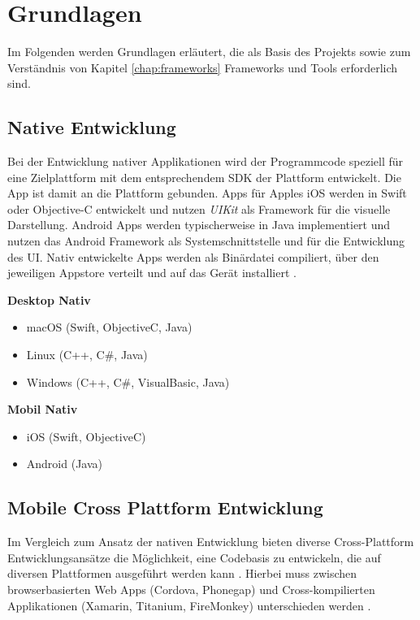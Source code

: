 
\chapter{Grundlagen}

Im Folgenden werden Grundlagen erläutert, die als Basis des Projekts sowie zum Verständnis von Kapitel \ref{chap:frameworks} Frameworks und Tools erforderlich sind.


\section{Native Entwicklung}

Bei der Entwicklung nativer Applikationen wird der Programmcode speziell für eine Zielplattform mit dem entsprechendem \ac{SDK} der Plattform entwickelt.
Die App ist damit an die Plattform gebunden. Apps für Apples iOS werden in Swift oder Objective-C entwickelt und nutzen \emph{UIKit} als Framework für die visuelle Darstellung.
Android Apps werden typischerweise in Java implementiert und nutzen das Android Framework als Systemschnittstelle und für die Entwicklung des \ac{UI}.
Nativ entwickelte Apps werden als Binärdatei compiliert, über den jeweiligen Appstore verteilt und auf das Gerät installiert \cite{Heitkoetter2013}.

\vspace{0.3cm}
\textbf{Desktop Nativ}
\begin{itemize}
\item macOS (Swift, ObjectiveC, Java)
\item Linux (C++, C\#, Java)
\item Windows (C++, C\#, VisualBasic, Java)
\end{itemize}
\vspace{0.3cm}

\textbf{Mobil Nativ}
\begin{itemize}
\item iOS (Swift, ObjectiveC)
\item Android (Java)
\end{itemize}
\vspace{0.3cm}

\section{Mobile Cross Plattform Entwicklung}

Im Vergleich zum Ansatz der nativen Entwicklung bieten diverse Cross-Plattform Entwicklungsansätze die Möglichkeit, eine Codebasis zu entwickeln,
die auf diversen Plattformen ausgeführt werden kann \cite{Heitkoetter2013}.
Hierbei muss zwischen browserbasierten Web Apps (Cordova, Phonegap) und Cross-kompilierten Applikationen (Xamarin, Titanium, FireMonkey) unterschieden werden
\cite{Xamar84:online}.

